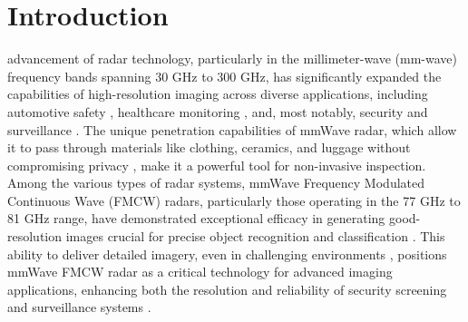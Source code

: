\documentclass[journal,article,submit,pdftex,moreauthors]{Definitions/mdpi}
\begin{document}







\section{Introduction}
 advancement of radar technology, particularly in the millimeter-wave (mm-wave) frequency bands spanning 30 GHz to 300 GHz, has significantly expanded the capabilities of high-resolution imaging across diverse applications, including automotive safety \cite{alvarez2019millimeter, smith2022radar}, healthcare monitoring \cite{li2020wireless, zhang2022neural, guo2021deep}, and, most notably, security and surveillance \cite{liu2021deep, chen2021image, park2020high}. The unique penetration capabilities of mmWave radar, which allow it to pass through materials like clothing, ceramics, and luggage without compromising privacy \cite{cianca2013radar, lee2020radar, sun2019machine}, make it a powerful tool for non-invasive inspection. Among the various types of radar systems, mmWave Frequency Modulated Continuous Wave (FMCW) radars, particularly those operating in the 77 GHz to 81 GHz range, have demonstrated exceptional efficacy in generating good-resolution images crucial for precise object recognition and classification \cite{gao2020synthetic, zheng2019robust, huang2022millimeter}. This ability to deliver detailed imagery, even in challenging environments \cite{liu2023dynamic, zhang2023radar, yu2023machine}, positions mmWave FMCW radar as a critical technology for advanced imaging applications, enhancing both the resolution and reliability of security screening and surveillance systems \cite{liu2022fusion, li2022deep, chen2023real}.
\end{document}
